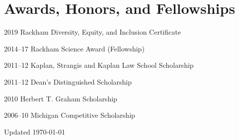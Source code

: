 \documentclass[12pt,letterpaper]{report}
\begin{document}
\section*{Awards, Honors, and Fellowships}

\begin{tablist}
    
	\item[2019] \tab Rackham Diversity, Equity, and Inclusion Certificate

	\item[2014--17] \tab Rackham Science Award (Fellowship)
        
	\item[2011--12] \tab Kaplan, Strangis and Kaplan Law School Scholarship 
        
	\item[2011--12] \tab Dean's Distinguished Scholarship
        
	\item[2010] \tab Herbert T. Graham Scholarship
        
	\item[2006--10] \tab Michigan Competitive Scholarship

\end{tablist}



\begin{center}
        \vfill
        Updated \monthyeardate\today
\end{center}
\end{document}

